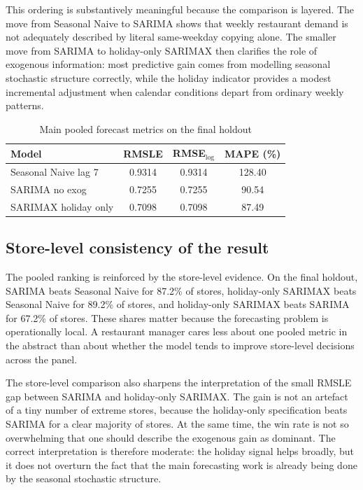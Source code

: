 \documentclass[11pt,oneside]{scrartcl}
\begin{document}
This ordering is substantively meaningful because the comparison is layered. The move from Seasonal Naive to SARIMA shows that weekly restaurant demand is not adequately described by literal same-weekday copying alone. The smaller move from SARIMA to holiday-only SARIMAX then clarifies the role of exogenous information: most predictive gain comes from modelling seasonal stochastic structure correctly, while the holiday indicator provides a modest incremental adjustment when calendar conditions depart from ordinary weekly patterns.

\begin{table}[H]
\centering
\caption{Main pooled forecast metrics on the final holdout}
\begin{tabular}{lccc}
\toprule
Model & RMSLE & RMSE$_{\log}$ & MAPE (\%) \\
\midrule
Seasonal Naive lag 7 & 0.9314 & 0.9314 & 128.40 \\
SARIMA no exog & 0.7255 & 0.7255 & 90.54 \\
SARIMAX holiday only & 0.7098 & 0.7098 & 87.49 \\
\bottomrule
\end{tabular}
\end{table}

\subsection{Store-level consistency of the result}
The pooled ranking is reinforced by the store-level evidence. On the final holdout, SARIMA beats Seasonal Naive for 87.2\% of stores, holiday-only SARIMAX beats Seasonal Naive for 89.2\% of stores, and holiday-only SARIMAX beats SARIMA for 67.2\% of stores. These shares matter because the forecasting problem is operationally local. A restaurant manager cares less about one pooled metric in the abstract than about whether the model tends to improve store-level decisions across the panel.

The store-level comparison also sharpens the interpretation of the small RMSLE gap between SARIMA and holiday-only SARIMAX. The gain is not an artefact of a tiny number of extreme stores, because the holiday-only specification beats SARIMA for a clear majority of stores. At the same time, the win rate is not so overwhelming that one should describe the exogenous gain as dominant. The correct interpretation is therefore moderate: the holiday signal helps broadly, but it does not overturn the fact that the main forecasting work is already being done by the seasonal stochastic structure.
\end{document}
